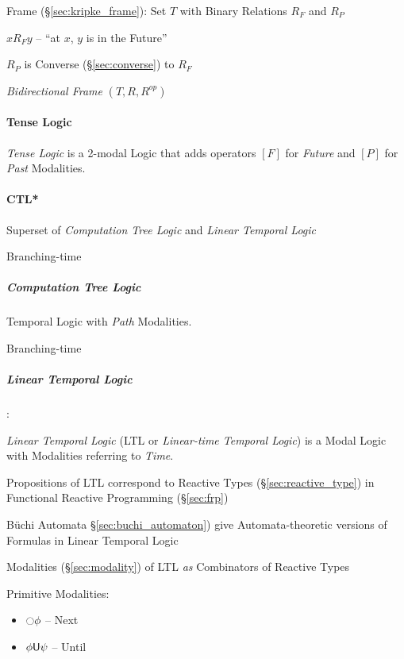 Frame (\S\ref{sec:kripke_frame}): Set $T$ with Binary Relations $R_F$
and $R_P$

$x R_F y$ -- ``at $x$, $y$ is in the Future''

$R_P$ is Converse (\S\ref{sec:converse}) to $R_F$

\emph{Bidirectional Frame} $(T,R,R^{op})$



\paragraph{Tense Logic}\label{sec:tense_logic}\hfill

\emph{Tense Logic} is a 2-modal Logic that adds operators $[F]$ for
\emph{Future} and $[P]$ for \emph{Past} Modalities.



\paragraph{CTL*}\label{sec:ctl_star}\hfill

Superset of \emph{Computation Tree Logic} and \emph{Linear
  Temporal Logic}

Branching-time



\subparagraph{Computation Tree Logic}\label{sec:ctl}\hfill

Temporal Logic with \emph{Path} Modalities.

Branching-time



\subparagraph{Linear Temporal Logic}\label{sec:linear_temporal}\hfill

\cite{jeffrey12}:

\emph{Linear Temporal Logic} (LTL or \emph{Linear-time Temporal
  Logic}) is a Modal Logic with Modalities referring to \emph{Time}.

Propositions of LTL correspond to Reactive Types
(\S\ref{sec:reactive_type}) in Functional Reactive Programming
(\S\ref{sec:frp})

B\"uchi Automata \S\ref{sec:buchi_automaton}) give Automata-theoretic
versions of Formulas in Linear Temporal Logic

Modalities (\S\ref{sec:modality}) of LTL \emph{as} Combinators of
Reactive Types

Primitive Modalities:
\begin{itemize}
  \item $\ocircle \phi$ -- Next
  \item $\phi \mathsf{U} \psi$ -- Until
\end{itemize}

